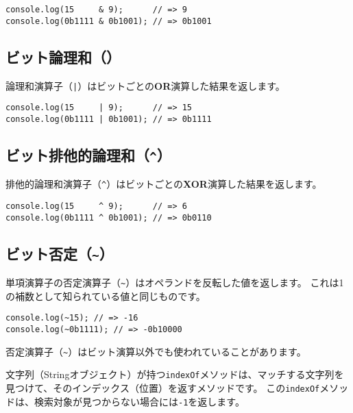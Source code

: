 \begin{lstlisting}
console.log(15     & 9);      // => 9
console.log(0b1111 & 0b1001); // => 0b1001
\end{lstlisting}

\hypertarget{bit-or}{%
\subsection{\texorpdfstring{ビット論理和（\texttt{\textbar{}}）}{ビット論理和（\textbar{}）}}\label{bit-or}}

論理和演算子（\texttt{|}）はビットごとの\textbf{OR}演算した結果を返します。

\begin{lstlisting}
console.log(15     | 9);      // => 15
console.log(0b1111 | 0b1001); // => 0b1111
\end{lstlisting}

\hypertarget{bit-xor}{%
\subsection{\texorpdfstring{ビット排他的論理和（\texttt{\^{}}）}{ビット排他的論理和（\^{}）}}\label{bit-xor}}

排他的論理和演算子（\texttt{\^}）はビットごとの\textbf{XOR}演算した結果を返します。

\begin{lstlisting}
console.log(15     ^ 9);      // => 6
console.log(0b1111 ^ 0b1001); // => 0b0110
\end{lstlisting}

\hypertarget{bit-not}{%
\subsection{\texorpdfstring{ビット否定（\texttt{\textasciitilde{}}）}{ビット否定（\textasciitilde{}）}}\label{bit-not}}

単項演算子の否定演算子（\texttt{\~}）はオペランドを反転した値を返します。
これは1の補数として知られている値と同じものです。

\begin{lstlisting}
console.log(~15); // => -16
console.log(~0b1111); // => -0b10000
\end{lstlisting}

否定演算子（\texttt{\~}）はビット演算以外でも使われていることがあります。

文字列（Stringオブジェクト）が持つ\texttt{indexOf}メソッドは、マッチする文字列を見つけて、そのインデックス（位置）を返すメソッドです。
この\texttt{indexOf}メソッドは、検索対象が見つからない場合には\texttt{-1}を返します。

